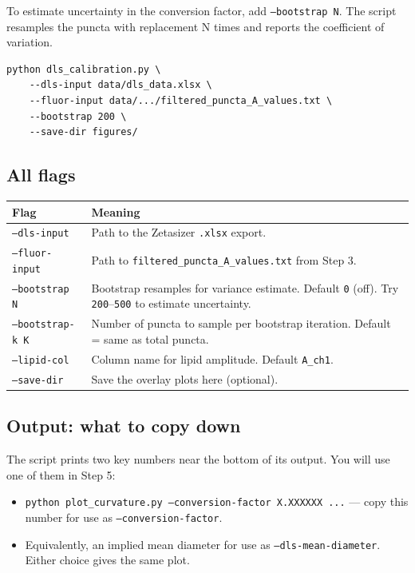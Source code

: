 \documentclass[11pt]{article}
\newcommand{\code}[1]{\texttt{#1}}
\newcommand{\flag}[1]{\texttt{#1}}
\begin{document}
To estimate uncertainty in the conversion factor, add
\code{--bootstrap N}. The script resamples the puncta with
replacement N times and reports the coefficient of variation.

\begin{lstlisting}
python dls_calibration.py \
    --dls-input data/dls_data.xlsx \
    --fluor-input data/.../filtered_puncta_A_values.txt \
    --bootstrap 200 \
    --save-dir figures/
\end{lstlisting}

\subsection*{All flags}

\begin{tabularx}{\linewidth}{l X}
\toprule
\textbf{Flag} & \textbf{Meaning} \\
\midrule
\flag{--dls-input}    & Path to the Zetasizer \code{.xlsx} export. \\
\flag{--fluor-input}  & Path to \code{filtered\_puncta\_A\_values.txt}
                        from Step 3. \\
\flag{--bootstrap N}  & Bootstrap resamples for variance estimate.
                        Default \code{0} (off). Try \code{200}--\code{500}
                        to estimate uncertainty. \\
\flag{--bootstrap-k K}& Number of puncta to sample per bootstrap
                        iteration. Default = same as total puncta. \\
\flag{--lipid-col}    & Column name for lipid amplitude. Default
                        \code{A\_ch1}. \\
\flag{--save-dir}     & Save the overlay plots here (optional). \\
\bottomrule
\end{tabularx}

\subsection*{Output: what to copy down}

The script prints two key numbers near the bottom of its output. You
will use one of them in Step 5:

\begin{itemize}[leftmargin=*]
    \item \code{python plot\_curvature.py --conversion-factor X.XXXXXX
    ...} --- copy this number for use as
    \code{--conversion-factor}.
    \item Equivalently, an implied mean diameter for use as
    \code{--dls-mean-diameter}. Either choice gives the same plot.
\end{itemize}
\end{document}
